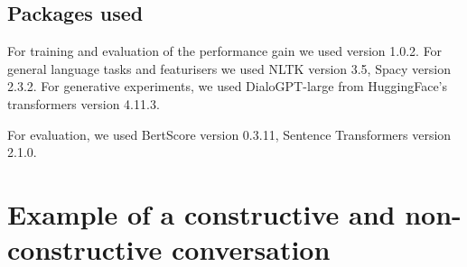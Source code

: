 \documentclass[acmsmall,manuscript,screen]{acmart}
\begin{document}
\subsection{Packages used}
For training and evaluation of the performance gain we used \cite{scikit-learn} version 1.0.2. For general language tasks and featurisers we used NLTK \cite{bird2009natural} version 3.5, Spacy \cite{spacy2} version 2.3.2. For generative experiments, we used DialoGPT-large from HuggingFace's transformers version 4.11.3.

For evaluation, we used BertScore \cite{bertscore} version 0.3.11, Sentence Transformers version 2.1.0.



\clearpage
\section{Example of a constructive and non-constructive conversation}
\label{app:annotated}
\end{document}
